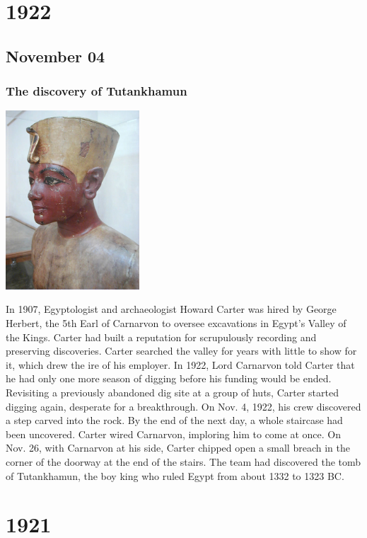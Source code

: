 \documentclass[11pt]{report}
\begin{document}
\chapter{1922}
\section{November 04}
\subsection{The discovery of Tutankhamun}
\vspace{2mm}\begin{center}\includegraphics[width=5cm]{./img/tutankhamon.jpg}\end{center}
In 1907, Egyptologist and archaeologist Howard Carter was hired by George Herbert, the 5th Earl of Carnarvon to oversee excavations in Egypt’s Valley of the Kings. Carter had built a reputation for scrupulously recording and preserving discoveries.
Carter searched the valley for years with little to show for it, which drew the ire of his employer. In 1922, Lord Carnarvon told Carter that he had only one more season of digging before his funding would be ended.\\
\indent Revisiting a previously abandoned dig site at a group of huts, Carter started digging again, desperate for a breakthrough.
On Nov. 4, 1922, his crew discovered a step carved into the rock. By the end of the next day, a whole staircase had been uncovered. Carter wired Carnarvon, imploring him to come at once.
On Nov. 26, with Carnarvon at his side, Carter chipped open a small breach in the corner of the doorway at the end of the stairs.
The team had discovered the tomb of Tutankhamun, the boy king who ruled Egypt from about 1332 to 1323 BC.

\chapter{1921}
\end{document}
